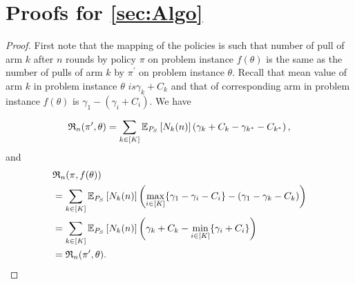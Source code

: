 \section{Proofs for \cref{sec:Algo}}
\propEquivalence*
\begin{proof}First note that the mapping of the policies is such that number of pull of arm $k$ after $n$ rounds by policy $\pi$ on problem instance $f(\theta)$ is the same as the number of pulls of arm $k$ by $\pi^\prime$ on problem instance $\theta$. Recall that mean value of arm $k$ in problem instance $\theta$ $ is \gamma_k +C_k$ and that of corresponding arm in problem instance $f(\theta)$ is $\gamma_1-(\gamma_i+C_i)$. We have
	
	\begin{align*}
	\mathfrak{R}_n(\pi^\prime,\theta) = \sum_{k\in [K]} \mathbb{E}_{P_S}\left[N_k(n)\right](\gamma_k+C_k-\gamma_{k^*}-C_{k^*}) \,,
	\end{align*}
	and
	\begin{align*}
	&\mathfrak{R}_n(\pi,f(\theta))\\
	&= \sum_{k\in [K]} \mathbb{E}_{P_S}\left[N_k(n)\right]\left (\max_{i \in [K]}\{\gamma_1-\gamma_i- C_i\}-(\gamma_1-\gamma_k- C_k)\right) \\
	&= \sum_{k\in [K]} \mathbb{E}_{P_S}\left[N_k(n)\right]\left (\gamma_k+ C_k - \min_{i \in [K]}\{\gamma_i+ C_i\}\right) \\
	&=\mathfrak{R}_n(\pi^\prime,\theta).
	\end{align*}
	\end{proof}
